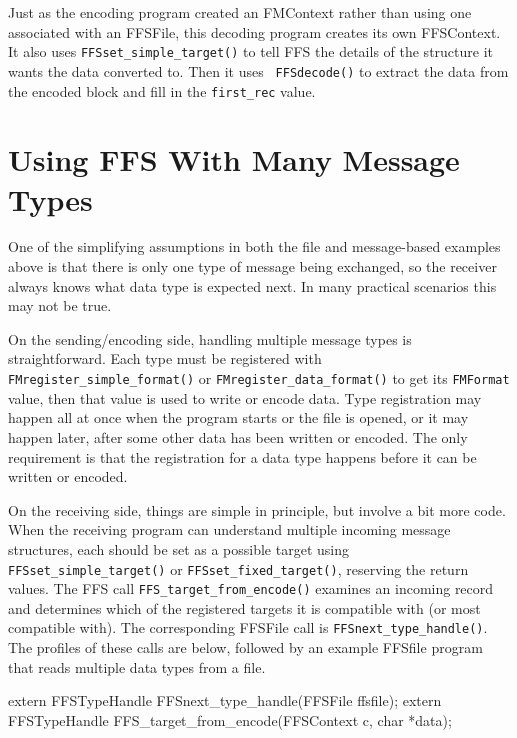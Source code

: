 Just as the encoding program created an FMContext rather than using one
associated with an FFSFile, this decoding program creates its own
FFSContext.  It also uses {\tt FFSset\_simple\_target()} to tell FFS the
details of the structure it wants the data converted to.  Then it uses {\tt
  FFSdecode()} to extract the data from the encoded block and fill in the
{\tt first\_rec} value. 
\section{Using FFS With Many Message Types}

One of the simplifying assumptions in both the file and message-based
examples above is that there is only one type of message being exchanged,
so the receiver always knows what data type is expected next.  In many
practical scenarios this may not be true.

On the sending/encoding side, handling multiple message types is
straightforward.  Each type must be registered with {\tt
  FMregister\_simple\_format()} or {\tt FMregister\_data\_format()} to get its
{\tt FMFormat} value, then that value is used to write or encode data.  Type
registration may happen all at once when the program starts or the file is
opened, or it may happen later, after some other data has been written or
encoded.  The only requirement is that the registration for a data type
happens before it can be written or encoded.

On the receiving side, things are simple in principle, but involve a bit
more code.  When the receiving program can understand multiple incoming 
message structures, each should be set as a possible target using {\tt
  FFSset\_simple\_target()} or {\tt FFSset\_fixed\_target()}, reserving the
return values.  The FFS call {\tt FFS\_target\_from\_encode()} examines an
incoming record and determines which of the registered targets it is
compatible with (or most compatible with).  The corresponding FFSFile call
is {\tt FFSnext\_type\_handle()}.  The profiles of these calls are below,
followed by an example FFSfile program that reads multiple data types from a
file.
\begin{Code}
extern FFSTypeHandle FFSnext_type_handle(FFSFile ffsfile);
extern FFSTypeHandle FFS_target_from_encode(FFSContext c, char *data);
\end{Code}

